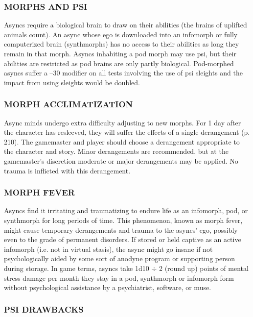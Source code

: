 \subsubsection{MORPHS AND PSI} 

Asyncs require a biological brain to draw on their abilities (the brains of uplifted animals count). An async whose ego is downloaded into an infomorph or fully computerized brain (synthmorphs) has no access to their abilities as long they remain in that morph. Asyncs inhabiting a pod morph may use psi, but their abilities are restricted as pod brains are only partly biological. Pod-morphed asyncs suffer a –30 modifier on all tests involving the use of psi sleights and the impact from using sleights would be doubled. 

\subsubsection{MORPH ACCLIMATIZATION} 

Async minds undergo extra difficulty adjusting to new morphs. For 1 day after the character has resleeved, they will suffer the effects of a single derangement (p. 210). The gamemaster and player should choose a derangement appropriate to the character and story. Minor derangements are recommended, but at the gamemaster’s discretion moderate or major derangements may be applied. No trauma is inflicted with this derangement. 

\subsubsection{MORPH FEVER} 

Asyncs find it irritating and traumatizing to endure life as an infomorph, pod, or synthmorph for long periods of time. This phenomenon, known as morph fever, might cause temporary derangements and trauma to the asyncs’ ego, possibly even to the grade of permanent disorders. If stored or held captive as an active infomorph (i.e. not in virtual stasis), the async might go insane if not psychologically aided by some sort of anodyne program or supporting person during storage. In game terms, asyncs take 1d10 $\div$ 2 (round up) points of mental stress damage per month they stay in a pod, synthmorph or infomorph form without psychological assistance by a psychiatrist, software, or muse. 

\subsubsection{PSI DRAWBACKS} 

